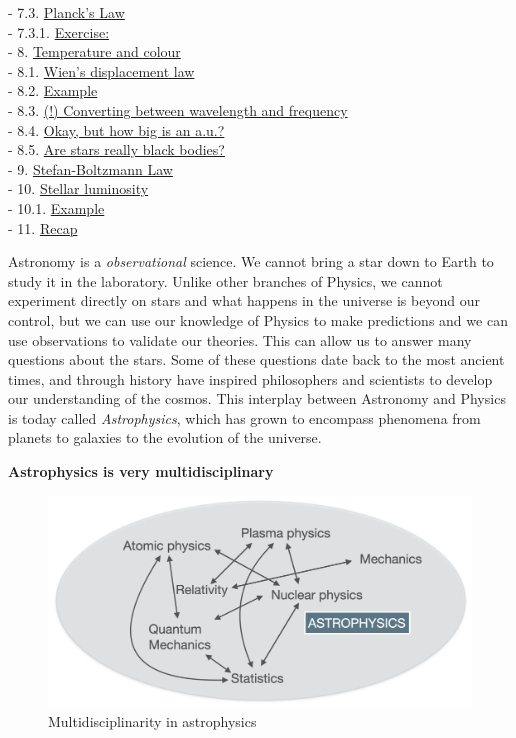 \documentclass[
  letterpaper,
  DIV=11,
  numbers=noendperiod]{scrartcl}
\begin{document}
- 7.3. \protect\hyperlink{toc7_3_}{Planck's Law}\\
- 7.3.1. \protect\hyperlink{toc7_3_1_}{Exercise:}\\
- 8. \protect\hyperlink{toc8_}{Temperature and colour}\\
- 8.1. \protect\hyperlink{toc8_1_}{Wien's displacement law}\\
- 8.2. \protect\hyperlink{toc8_2_}{Example}\\
- 8.3. \protect\hyperlink{toc8_3_}{(!) Converting between wavelength and
frequency}\\
- 8.4. \protect\hyperlink{toc8_4_}{Okay, but how big is an a.u.?}\\
- 8.5. \protect\hyperlink{toc8_5_}{Are stars really black bodies?}\\
- 9. \protect\hyperlink{toc9_}{Stefan-Boltzmann Law}\\
- 10. \protect\hyperlink{toc10_}{Stellar luminosity}\\
- 10.1. \protect\hyperlink{toc10_1_}{Example}\\
- 11. \protect\hyperlink{toc11_}{Recap}

Astronomy is a \emph{observational} science. We cannot bring a star down
to Earth to study it in the laboratory. Unlike other branches of
Physics, we cannot experiment directly on stars and what happens in the
universe is beyond our control, but we can use our knowledge of Physics
to make predictions and we can use observations to validate our
theories. This can allow us to answer many questions about the stars.
Some of these questions date back to the most ancient times, and through
history have inspired philosophers and scientists to develop our
understanding of the cosmos. This interplay between Astronomy and
Physics is today called \emph{Astrophysics}, which has grown to
encompass phenomena from planets to galaxies to the evolution of the
universe.

\textbf{Astrophysics is very multidisciplinary}

\begin{figure}

{\centering \includegraphics{img/astrophysics_multidisciplinary.png}

}

\caption{Multidisciplinarity in astrophysics}

\end{figure}
\end{document}
